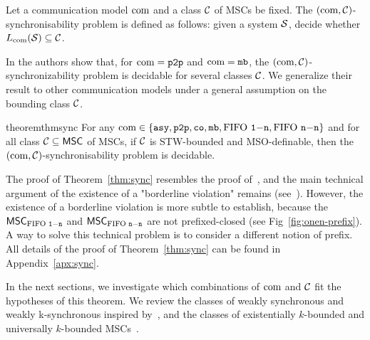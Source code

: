 \begin{definition}
Let a communication model $\textup{com}$ and a class $\mathcal{C}$ of MSCs be fixed. The
$(\textup{com},\mathcal{C})$-synchronisability problem is defined as follows: given a
system $\mathcal{S}$, decide whether $L_{\textup{com}}(\mathcal{S})\subseteq \mathcal{C}$.
\end{definition}

In \cite{BolligGFLLS21} the authors show that, for $\textup{com} = \mathtt{p2p}$ and $\textup{com} = \mathtt{mb}$, 
the $(\textup{com},\mathcal{C})$-synchronizability problem is decidable for several classes $\mathcal{C}$. 
We generalize their result to other communication models under a general assumption on the bounding class $\mathcal{C}$.

\begin{restatable}{theorem}{thmsync}\label{thm:sync}
	For any $\textup{com} \in \{\mathtt{asy}, \mathtt{p2p}, \mathtt{co}, \mathtt{mb}, \text{FIFO } \mathtt{1\mathsf{-}n}, \text{FIFO } \mathtt{n\mathsf{-}n}\}$ and
	for all class $\mathcal{C} \subseteq \mathsf{MSC}$ of MSCs,
	if $\mathcal{C}$ is STW-bounded and MSO-definable,
	then the $(\textup{com},\mathcal{C})$-synchronisability problem is decidable.
\end{restatable}
The proof of Theorem~\ref{thm:sync} resembles the proof of~\cite[Theorem~11]{BolligGFLLS21-long}, and the main technical argument of the existence of a "borderline violation" remains 
(see~\cite[Lemma~9]{BolligGFLLS21-long}). However, the existence of a borderline violation is more subtle to establish, because the $\mathsf{MSC}_{\text{FIFO } \mathtt{1\mathsf{-}n}}$ and 
$\mathsf{MSC}_{\text{FIFO } \mathtt{n\mathsf{-}n}}$ are not prefixed-closed (see Fig~\ref{fig:onen-prefix}).
A way to solve this technical problem is to consider a different notion of prefix. All details of
the proof of Theorem~\ref{thm:sync} can be found in Appendix~\ref{apx:sync}.


In the next sections, we investigate which combinations of $\textup{com}$ and $\mathcal{C}$ fit the hypotheses of this theorem.
We review the classes of weakly synchronous and weakly k-synchronous inspired
by~\cite{DBLP:conf/cav/BouajjaniEJQ18},
and the classes of existentially $k$-bounded and universally $k$-bounded MSCs~\cite{genest2004kleene}.


